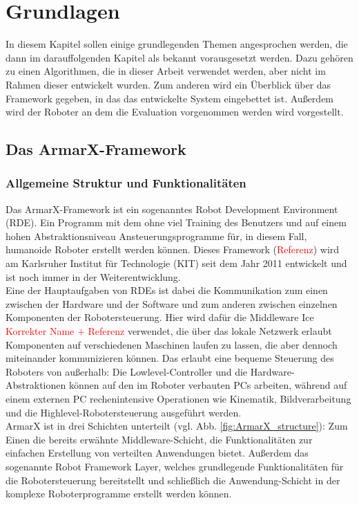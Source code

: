 \chapter{Grundlagen}

In diesem Kapitel sollen einige grundlegenden Themen angesprochen werden, die dann im darauffolgenden Kapitel als bekannt vorausgesetzt werden. Dazu gehören zu einen Algorithmen, die in dieser Arbeit verwendet werden, aber nicht im Rahmen dieser entwickelt wurden. Zum anderen wird ein Überblick über das Framework gegeben, in das das entwickelte System eingebettet ist. Außerdem wird der Roboter an dem die Evaluation vorgenommen werden wird vorgestellt.

\section{Das ArmarX-Framework}
\subsection{Allgemeine Struktur und Funktionalitäten}

Das ArmarX-Framework ist ein sogenanntes \glqq Robot Development Environment\grqq{} (RDE). Ein Programm mit dem ohne viel Training des Benutzers und auf einem hohen Abstraktionsniveau Ansteuerungsprogramme für, in diesem Fall, humanoide Roboter erstellt werden können. Dieses Framework (\textcolor{red}{Referenz}) wird am Karlsruher Institut für Technologie (KIT) seit dem Jahr 2011 entwickelt und ist noch immer in der Weiterentwicklung. \\
Eine der Hauptaufgaben von RDEs ist dabei die Kommunikation zum einen zwischen der Hardware und der Software und zum anderen zwischen einzelnen Komponenten der Robotersteuerung. Hier wird dafür die Middleware \glqq Ice\grqq{} \textcolor{red}{Korrekter Name + Referenz} verwendet, die über das lokale Netzwerk erlaubt Komponenten auf verschiedenen Maschinen laufen zu lassen, die aber dennoch miteinander kommunizieren können. Das erlaubt eine bequeme Steuerung des Roboters von außerhalb: Die Lowlevel-Controller und die Hardware-Abstraktionen können auf den im Roboter verbauten PCs arbeiten, während auf einem externen PC rechenintensive Operationen wie Kinematik, Bildverarbeitung und die Highlevel-Robotersteuerung ausgeführt werden.
\\

ArmarX ist in drei Schichten unterteilt (vgl. Abb. \ref{fig:ArmarX_structure}): Zum Einen die bereits erwähnte Middleware-Schicht, die Funktionalitäten zur einfachen Erstellung von verteilten Anwendungen bietet. Außerdem das sogenannte \glqq Robot Framework Layer\grqq{}, welches grundlegende Funktionalitäten für die Robotersteuerung bereitstellt und schließlich die Anwendung-Schicht in der komplexe Roboterprogramme erstellt werden können.

